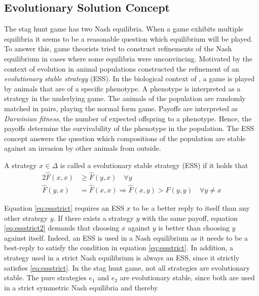 \subsection{Evolutionary Solution Concept}
The stag hunt game has two Nash equilibria. When a game exhibits 
multiple equilibria it seems to be a reasonable question 
which equilibrium will be played. To answer this, 
game theorists tried to construct refinements 
of the Nash equilibrium in cases where some equilibria were unconvincing. 
Motivated by the context of evolution in animal populations 
\textcite{smith_lhe_1973} constructed the refinement of an 
\textit{evolutionary stable strategy} (ESS).  
In the biological context of \textcite{smith_lhe_1973}, a game is played 
by animals that are of a specific phenotype. A phenotype is interpreted
as a strategy in the underlying game. The animals of the population are randomly
matched in pairs, playing the normal form game. Payoffs are interpreted as
\textit{Darwinian fitness}, the number of expected offspring to a phenotype.
Hence, the payoffs determine the survivability of the phenotype in the 
population.
The ESS concept answers the question which compositions of the population are
stable against an invasion by other animals from outside.
\begin{mydef}
        \label{def:ess}
        A strategy $x \in \Delta$ is called a evolutionary stable strategy 
        (ESS) if it holds that
        \begin{alignat}{2}
                \hat{F}(x,x) &\geq \hat{F}(y,x) \quad \forall y \label{eq:essstrict} \\
                \hat{F}(y,x) &= \hat{F}(x,x) \Rightarrow  
                \hat{F}(x,y) > \hat{F}(y,y) \quad \forall y \neq x \label{eq:essstrict2}
        \end{alignat}
\end{mydef}
Equation \eqref{eq:essstrict}
requires an ESS $x$ to be a better reply to itself than any other strategy $y$.
If there exists a strategy $y$ with the same payoff, equation 
\eqref{eq:essstrict2} demands that choosing $x$ against $y$ is better 
than choosing $y$ against itself.
Indeed, an ESS is used in a 
Nash equilibrium as it needs to be a best-reply to satisfy the 
condition in equation \eqref{eq:essstrict}. 
In addition, a strategy used in a strict 
Nash equilibrium is always an ESS, since it strictly satisfies 
\eqref{eq:essstrict}. 
In the stag hunt game, not all strategies are evolutionary stable.
The pure strategies $e_1$ and $e_2$ are evolutionary stable,
since both are used in a strict symmetric Nash equilibria and thereby 
